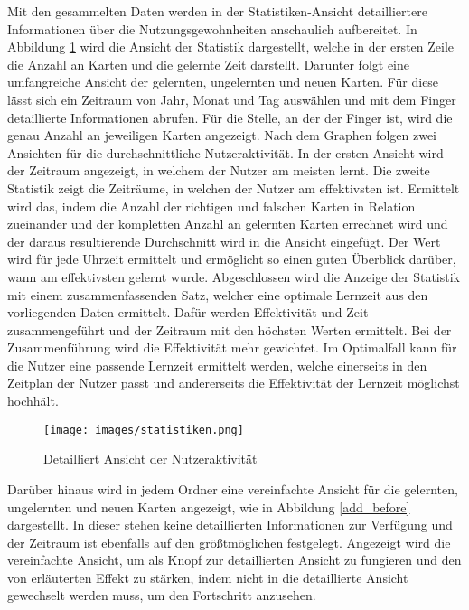 Mit den gesammelten Daten werden in der Statistiken-Ansicht detailliertere Informationen über die Nutzungsgewohnheiten anschaulich aufbereitet. In Abbildung \ref{fig:statistics} wird die Ansicht der Statistik dargestellt, welche in der ersten Zeile die Anzahl an Karten und die gelernte Zeit darstellt. Darunter folgt eine umfangreiche Ansicht der gelernten, ungelernten und neuen Karten. Für diese lässt sich ein Zeitraum von Jahr, Monat und Tag auswählen und mit dem Finger detaillierte Informationen abrufen. Für die Stelle, an der der Finger ist, wird die genau Anzahl an jeweiligen Karten angezeigt. Nach dem Graphen folgen zwei Ansichten für die durchschnittliche Nutzeraktivität. In der ersten Ansicht wird der Zeitraum angezeigt, in welchem der Nutzer am meisten lernt. Die zweite Statistik zeigt die Zeiträume, in welchen der Nutzer am effektivsten ist. Ermittelt wird das, indem die Anzahl der richtigen und falschen Karten in Relation zueinander und der kompletten Anzahl an gelernten Karten errechnet wird und der daraus resultierende Durchschnitt wird in die Ansicht eingefügt. Der Wert wird für jede Uhrzeit ermittelt und ermöglicht so einen guten Überblick darüber, wann am effektivsten gelernt wurde. Abgeschlossen wird die Anzeige der Statistik mit einem zusammenfassenden Satz, welcher eine optimale Lernzeit aus den vorliegenden Daten ermittelt. Dafür werden Effektivität und Zeit zusammengeführt und der Zeitraum mit den höchsten Werten ermittelt. Bei der Zusammenführung wird die Effektivität mehr gewichtet. Im Optimalfall kann für die Nutzer eine passende Lernzeit ermittelt werden, welche einerseits in den Zeitplan der Nutzer passt und andererseits die Effektivität der Lernzeit möglichst hochhält.

\begin{figure}[ht!]
    \centering
    \texttt{[image: images/statistiken.png]}
    \caption{Detailliert Ansicht der Nutzeraktivität}
    \label{fig:statistics}
\end{figure}

Darüber hinaus wird in jedem Ordner eine vereinfachte Ansicht für die gelernten, ungelernten und neuen Karten angezeigt, wie in Abbildung \ref{add_before} dargestellt. In dieser stehen keine detaillierten Informationen zur Verfügung und der Zeitraum ist ebenfalls auf den größtmöglichen festgelegt. Angezeigt wird die vereinfachte Ansicht, um als Knopf zur detaillierten Ansicht zu fungieren und den von \cite{AtomicHabits} erläuterten Effekt zu stärken, indem nicht in die detaillierte Ansicht gewechselt werden muss, um den Fortschritt anzusehen.

